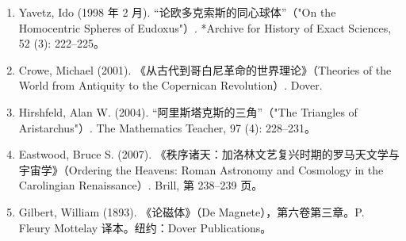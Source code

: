 \begin{enumerate}
\item Yavetz, Ido (1998 年 2 月). “论欧多克索斯的同心球体”（"On the Homocentric Spheres of Eudoxus"）. *Archive for History of Exact Sciences, 52 (3): 222–225。  
\item Crowe, Michael (2001). 《从古代到哥白尼革命的世界理论》（Theories of the World from Antiquity to the Copernican Revolution）. Dover.  
\item Hirshfeld, Alan W. (2004). “阿里斯塔克斯的三角”（"The Triangles of Aristarchus"）. The Mathematics Teacher, 97 (4): 228–231。  
\item Eastwood, Bruce S. (2007). 《秩序诸天：加洛林文艺复兴时期的罗马天文学与宇宙学》（Ordering the Heavens: Roman Astronomy and Cosmology in the Carolingian Renaissance）. Brill, 第 238–239 页。  
\item Gilbert, William (1893). 《论磁体》（De Magnete），第六卷第三章。P. Fleury Mottelay 译本。纽约：Dover Publications。
\end{enumerate}


